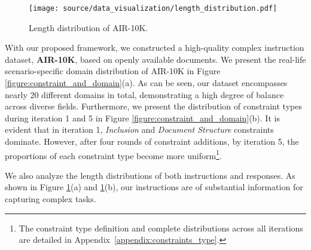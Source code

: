 \begin{figure}[t]
    \centering
    \texttt{[image: source/data\_visualization/length\_distribution.pdf]}
    \vspace{-3mm}
    \caption{Length distribution of AIR-10K.}
    \vspace{-3mm}
    \label{figure:length_distribution}
\end{figure}

With our proposed framework, we constructed a high-quality complex instruction dataset, \textbf{AIR-10K}, based on openly available documents. We present the real-life scenario-specific domain distribution of AIR-10K in Figure \ref{figure:constraint_and_domain}(a). As can be seen, our dataset encompasses nearly 20 different domains in total, demonstrating a high degree of balance across diverse fields. Furthermore, we present the distribution of constraint types during iteration 1 and 5 in Figure \ref{figure:constraint_and_domain}(b). It is evident that in iteration 1, \textit{Inclusion} and \textit{Document Structure} constraints dominate. However, after four rounds of constraint additions, by iteration 5, the proportions of each constraint type become more uniform\footnote{The constraint type definition and complete distributions across all iterations are detailed in Appendix~\ref{appendix:constraints_type}.}.

We also analyze the length distributions of both instructions and responses. As shown in Figure \ref{figure:length_distribution}(a) and \ref{figure:length_distribution}(b), our instructions are of substantial information for capturing complex tasks.
